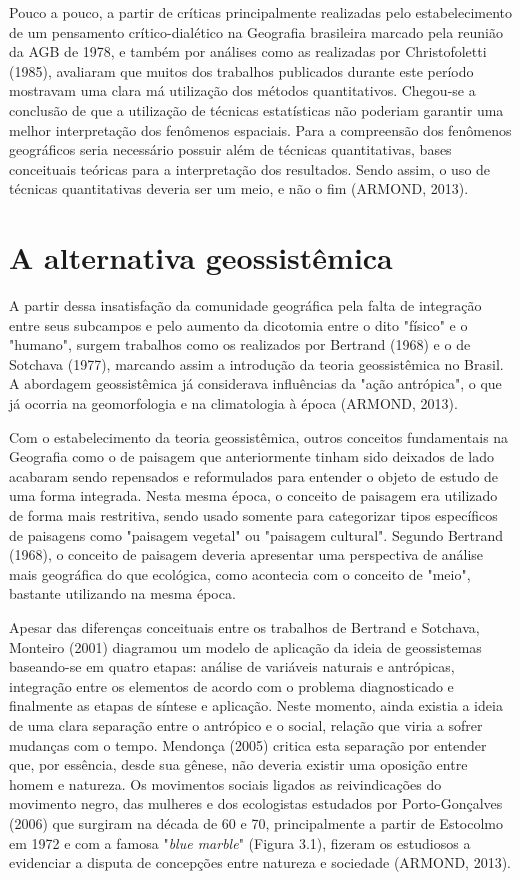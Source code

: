 Pouco a pouco, a partir de críticas principalmente realizadas pelo estabelecimento de um pensamento crítico-dialético na Geografia brasileira marcado pela reunião da AGB de 1978, e também por análises como as realizadas por Christofoletti (1985), avaliaram que muitos dos trabalhos publicados durante este período mostravam uma clara má utilização dos métodos quantitativos. Chegou-se a conclusão de que a utilização de técnicas estatísticas não poderiam garantir uma melhor interpretação dos fenômenos espaciais. Para a compreensão dos fenômenos geográficos seria necessário possuir além de técnicas quantitativas, bases conceituais teóricas para a interpretação dos resultados. Sendo assim, o uso de técnicas quantitativas deveria ser um meio, e não o fim (ARMOND, 2013).

\section{A alternativa geossistêmica}
A partir dessa insatisfação da comunidade geográfica pela falta de integração entre seus subcampos e pelo aumento da dicotomia entre o dito "físico" e o "humano", surgem trabalhos como os realizados por Bertrand (1968) e o de Sotchava (1977), marcando assim a introdução da teoria geossistêmica no Brasil. A abordagem geossistêmica já considerava influências da "ação antrópica", o que já ocorria na geomorfologia e na climatologia à época (ARMOND, 2013).

Com o estabelecimento da teoria geossistêmica, outros conceitos fundamentais na Geografia como o de paisagem que anteriormente tinham sido deixados de lado acabaram sendo repensados e reformulados para entender o objeto de estudo de uma forma integrada. Nesta mesma época, o conceito de paisagem era utilizado de forma mais restritiva, sendo usado somente para categorizar tipos específicos de paisagens como "paisagem vegetal" ou "paisagem cultural". Segundo Bertrand (1968), o conceito de paisagem deveria apresentar uma perspectiva de análise mais geográfica do que ecológica, como acontecia com o conceito de "meio", bastante utilizando na mesma época.

Apesar das diferenças conceituais entre os trabalhos de Bertrand e Sotchava, Monteiro (2001) diagramou um modelo de aplicação da ideia de geossistemas baseando-se em quatro etapas: análise de variáveis naturais e antrópicas, integração entre os elementos de acordo com o problema diagnosticado e finalmente as etapas de síntese e aplicação. Neste momento, ainda existia a ideia de uma clara separação entre o antrópico e o social, relação que viria a sofrer mudanças com o tempo. Mendonça (2005) critica esta separação por entender que, por essência, desde sua gênese, não deveria existir uma oposição entre homem e natureza. Os movimentos sociais ligados as reivindicações do movimento negro, das mulheres e dos ecologistas estudados por Porto-Gonçalves (2006) que surgiram na década de 60 e 70, principalmente a partir de Estocolmo em 1972 e com a famosa "\textit{blue marble}" (Figura 3.1), fizeram os estudiosos a evidenciar a disputa de concepções entre natureza e sociedade (ARMOND, 2013). 

